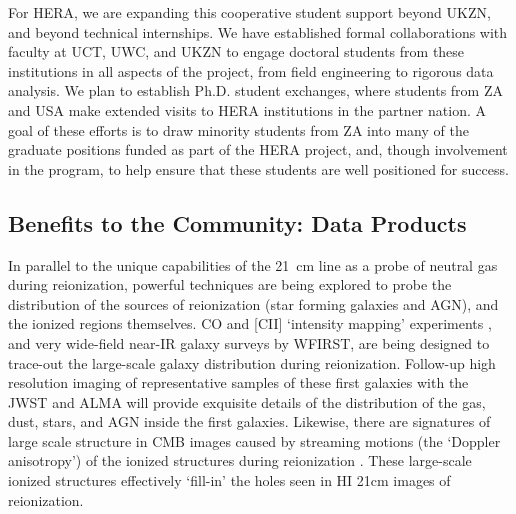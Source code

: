 \documentclass[preprint]{aastex}
\begin{document}
For HERA, we are expanding this cooperative student support beyond
UKZN, and beyond technical internships. We have established formal collaborations
with faculty at UCT, UWC, and UKZN to engage doctoral students from these
institutions in all aspects of the project, from
field engineering to rigorous data analysis. We plan to establish Ph.D.
student exchanges, where students from ZA and USA make extended visits
to HERA institutions in the partner nation.
A goal of these efforts is to draw
minority students from ZA into many of the graduate positions
funded as part of the HERA project, and, though involvement in the
program, to help ensure that these students are well positioned for
success.

%
%

\vspace{-0.25in}
\subsection{Benefits to the Community: Data Products}

In parallel to the
unique capabilities of the 21~cm line as a probe of neutral gas during
reionization, powerful
techniques are being explored to probe 
the distribution of the sources of reionization
(star forming galaxies and AGN), and the ionized regions themselves.  
CO and [CII] `intensity mapping' experiments \citep{carilli2011,lidz_et_al2011,gong_et_al2011}, 
and very wide-field
near-IR galaxy surveys by WFIRST, are being designed to trace-out the large-scale
galaxy distribution during reionization.
Follow-up high resolution imaging of representative
samples of these first galaxies with the JWST and ALMA will provide exquisite
details of the distribution of the gas, dust, stars, and AGN inside the first
galaxies. Likewise, there are signatures of large scale structure in CMB images
caused by streaming motions (the `Doppler anisotropy') of the ionized
structures during reionization \citep{alvarez_et_al2006,tashiro_et_al2010}. These large-scale 
ionized structures
effectively `fill-in' the holes seen in HI 21cm images of reionization. 
\end{document}
